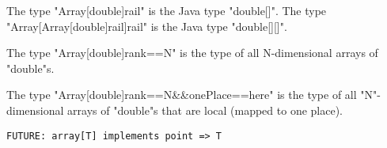 \begin{example}
  The type \xcd"Array[double]{rail}" is the Java type \xcd"double[]".
  The type \xcd"Array[Array[double]{rail}]{rail}" is the Java type \xcd"double[][]".

  The type \xcd"Array[double]{rank==N}" is the type of all N-dimensional arrays of
  \xcd"double"s.

  The type \xcd"Array[double]{rank==N&&onePlace==here}" is the
  type of all \xcd"N"-dimensional
  arrays of \xcd"double"s that are local (mapped to one place).  
\end{example}

\begin{verbatim}
FUTURE: array[T] implements point => T
\end{verbatim}

